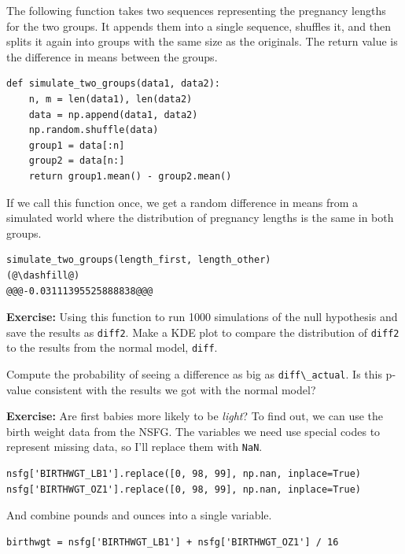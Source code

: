 The following function takes two sequences representing the pregnancy
lengths for the two groups. It appends them into a single sequence,
shuffles it, and then splits it again into groups with the same size as
the originals. The return value is the difference in means between the
groups.

\begin{lstlisting}[]
def simulate_two_groups(data1, data2):
    n, m = len(data1), len(data2)
    data = np.append(data1, data2)
    np.random.shuffle(data)
    group1 = data[:n]
    group2 = data[n:]
    return group1.mean() - group2.mean()
\end{lstlisting}

If we call this function once, we get a random difference in means from
a simulated world where the distribution of pregnancy lengths is the
same in both groups.

\begin{lstlisting}[]
simulate_two_groups(length_first, length_other)
(@\dashfill@)
@@@-0.03111395525888838@@@
\end{lstlisting}

\textbf{Exercise:} Using this function to run 1000 simulations of the
null hypothesis and save the results as \passthrough{\lstinline!diff2!}.
Make a KDE plot to compare the distribution of
\passthrough{\lstinline!diff2!} to the results from the normal model,
\passthrough{\lstinline!diff!}.

Compute the probability of seeing a difference as big as
\passthrough{\lstinline!diff\_actual!}. Is this p-value consistent with
the results we got with the normal model?

\textbf{Exercise:} Are first babies more likely to be \emph{light}? To
find out, we can use the birth weight data from the NSFG. The variables
we need use special codes to represent missing data, so I'll replace
them with \passthrough{\lstinline!NaN!}.

\begin{lstlisting}[]
nsfg['BIRTHWGT_LB1'].replace([0, 98, 99], np.nan, inplace=True)
nsfg['BIRTHWGT_OZ1'].replace([0, 98, 99], np.nan, inplace=True)
\end{lstlisting}

And combine pounds and ounces into a single variable.

\begin{lstlisting}[]
birthwgt = nsfg['BIRTHWGT_LB1'] + nsfg['BIRTHWGT_OZ1'] / 16
\end{lstlisting}

